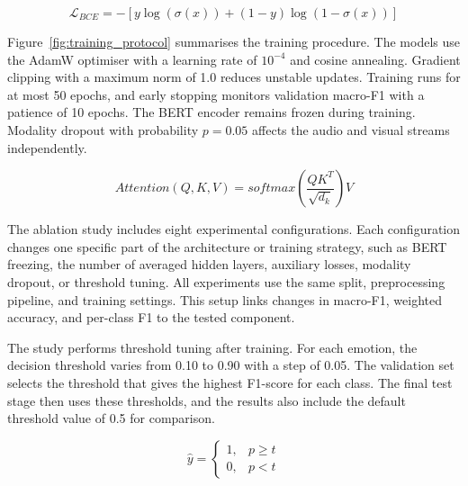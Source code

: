 \begin{equation}
\mathcal{L}_{BCE} =
- \left[
y \log(\sigma(x)) +
(1-y)\log(1-\sigma(x))
\right]
\end{equation}



Figure~\ref{fig:training_protocol} summarises the training procedure. The models use the AdamW optimiser with a learning rate of $10^{-4}$ and cosine annealing. Gradient clipping with a maximum norm of 1.0 reduces unstable updates. Training runs for at most 50 epochs, and early stopping monitors validation macro-F1 with a patience of 10 epochs. The BERT encoder remains frozen during training. Modality dropout with probability $p = 0.05$ affects the audio and visual streams independently.

\begin{equation}
Attention(Q,K,V)=softmax\left(\frac{QK^T}{\sqrt{d_k}}\right)V
\end{equation}



The ablation study includes eight experimental configurations. Each configuration changes one specific part of the architecture or training strategy, such as BERT freezing, the number of averaged hidden layers, auxiliary losses, modality dropout, or threshold tuning. All experiments use the same split, preprocessing pipeline, and training settings. This setup links changes in macro-F1, weighted accuracy, and per-class F1 to the tested component.

The study performs threshold tuning after training. For each emotion, the decision threshold varies from 0.10 to 0.90 with a step of 0.05. The validation set selects the threshold that gives the highest F1-score for each class. The final test stage then uses these thresholds, and the results also include the default threshold value of 0.5 for comparison.

\begin{equation}
\hat{y} =
\begin{cases}
1, & p \ge t \\
0, & p < t
\end{cases}
\end{equation}

